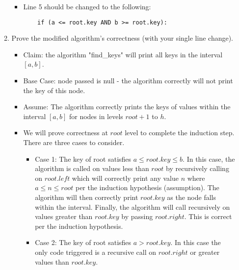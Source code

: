 \documentclass[letterpaper,11pt]{article}
\begin{document}
\begin{enumerate}
\begin{enumerate}
        \begin{itemize}
            \color{teal}
            \item Line 5 should be changed to the following:
\begin{verbatim}
    if (a <= root.key AND b >= root.key):
\end{verbatim}
        \end{itemize}

    \item Prove the modified algorithm's correctness (with your single line change).

        \begin{itemize}
            \color{teal}
            \item Claim: the algorithm "find\_keys" will print all keys in the
                interval $[a, b]$.
            \item Base Case: node passed is null - the algorithm correctly 
                will not print the key of this node. 
            \item Assume: The algorithm correctly prints the keys of values 
                within the interval $[a, b]$ for nodes in levels $root + 1$ to 
                $h$.
            \item We will prove correctness at $root$ level to complete the 
                induction step. There are three cases to consider.
                \begin{itemize}
                    \item Case 1: The key of root satisfies 
                        $a \le root.key \le b$. In this 
                        case, the algorithm is called on values less than
                        $root$ by recursively calling on $root.left$ which will
                        correctly print any value $n$ where $a \le n \le root$ 
                        per the induction hypothesis (assumption). The 
                        algorithm will then correctly print $root.key$ 
                        as the node falls within the interval. 
                        Finally, the algorithm will call
                        recursively on values greater than $root.key$ by 
                        passing $root.right$. This is correct per the induction
                        hypothesis. 
                    \item Case 2: The key of root satisfies $a > root.key$. In
                        this case the only code triggered is a recursive call
                        on  $root.right$ or greater values than $root.key$. 

\end{itemize}
\end{itemize}
\end{enumerate}
\end{enumerate}
\end{document}
